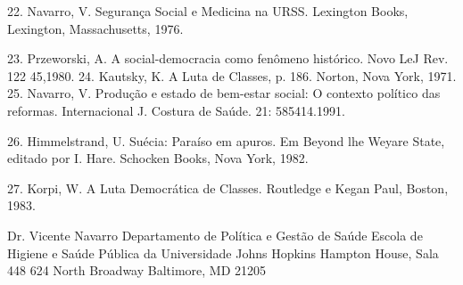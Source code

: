 \documentclass[twocolumn,amsmath,amssymb,aps,pre,floatfix]{revtex4-2}
\begin{document}
22. Navarro, V. Segurança Social e Medicina na URSS. Lexington Books, Lexington, Massachusetts, 1976.
\par
23. Przeworski, A. A social-democracia como fenômeno histórico. Novo LeJ Rev. 122 45,1980. 24. Kautsky, K. A Luta de Classes, p. 186. Norton, Nova York, 1971. 25. Navarro, V. Produção e estado de bem-estar social: O contexto político das reformas. Internacional J. Costura de Saúde. 21: 585414.1991.
\par
26. Himmelstrand, U. Suécia: Paraíso em apuros. Em Beyond lhe Weyare State, editado por I. Hare. Schocken Books, Nova York, 1982.
\par
27. Korpi, W. A Luta Democrática de Classes. Routledge e Kegan Paul, Boston, 1983.
\par
Dr. Vicente Navarro Departamento de Política e Gestão de Saúde Escola de Higiene e Saúde Pública da Universidade Johns Hopkins Hampton House, Sala 448 624 North Broadway Baltimore, MD 21205
\end{document}
